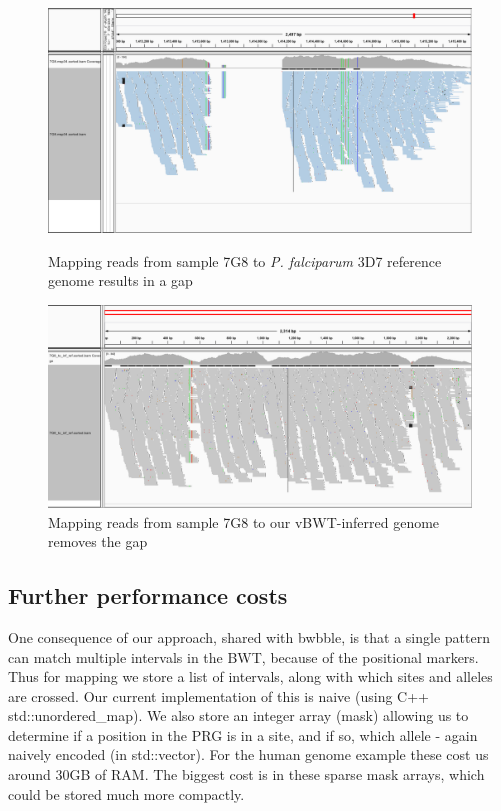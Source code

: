 \documentclass[runningheads,a4paper]{llncs}
\begin{document}
\begin{figure}[!tbp]
  \centering
  \begin{minipage}[b]{0.4\textwidth}
    \includegraphics[width=\textwidth]{7G8_to_3D7_pileup.png}
    \caption{Mapping reads from sample 7G8 to \textit{P. falciparum} 3D7 reference genome results in a gap}
  \end{minipage}
  \hfill
  \begin{minipage}[b]{0.45\textwidth}
    \includegraphics[width=\textwidth]{7G8_to_inf_ref_pileup.png}
    \caption{Mapping reads from sample 7G8 to our vBWT-inferred genome removes the gap }
  \end{minipage}
\end{figure}






\subsection{Further performance costs}
One  consequence of our approach, shared with bwbble, is that a single pattern can match multiple intervals in the BWT, because of the positional markers. Thus for mapping we store a list of intervals, along with which sites and alleles are crossed. Our current implementation of this is naive (using C++ std::unordered\_map). We also store an integer array (mask) allowing us to determine if a position in the PRG is in a site, and if so, which allele - again naively encoded (in std::vector). For the human genome example these cost us around 30GB of RAM. The biggest cost is in these sparse mask arrays, which could be stored much more compactly.
\end{document}

